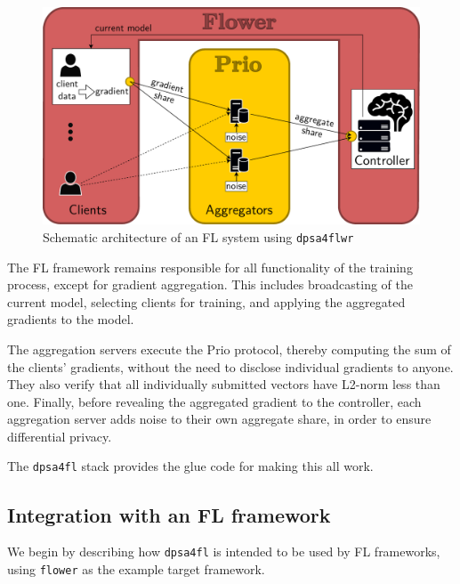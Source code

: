 \documentclass{article}
\begin{document}
\begin{figure}[h]
  \centering
  \includegraphics[width=\columnwidth]{assets/dpsa-overview-2-edit_no_explanations-2023-08-22.drawio-edit_rectangle_raw-joined-text_littleproblem-fixed-textfont-addnoise-fontsize.pdf}
  \caption{Schematic architecture of an FL system using \texttt{dpsa4flwr}}
  \label{fig:architecture}
\end{figure}

The FL framework remains responsible for all functionality of the training
process, except for gradient aggregation. This includes broadcasting of the
current model, selecting clients for training, and applying the aggregated
gradients to the model.

The aggregation servers execute the Prio protocol, thereby computing the sum of
the clients' gradients, without the need to disclose individual gradients to
anyone. They also verify that all individually submitted vectors have L2-norm
less than one. Finally, before revealing the aggregated gradient to the
controller, each aggregation server adds noise to their own aggregate share, in
order to ensure differential privacy.

The \texttt{dpsa4fl} stack provides the glue code for making this all
work.

\subsection{Integration with an FL framework}
We begin by describing how \texttt{dpsa4fl} is intended to be used by FL
frameworks, using \texttt{flower} as the example target framework.
\end{document}
